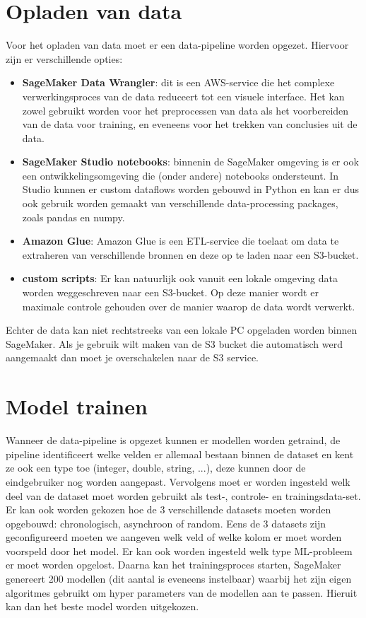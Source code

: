 \section{Opladen van data}
Voor het opladen van data moet er een data-pipeline worden opgezet. Hiervoor zijn er verschillende opties:
\begin{itemize}
    \item \textbf{SageMaker Data Wrangler}: dit is een AWS-service die het complexe verwerkingsproces van de data reduceert tot een visuele interface. Het kan zowel gebruikt worden voor het preprocessen van data als het voorbereiden van de data voor training, en eveneens voor het trekken van conclusies uit de data.
    \item  \textbf{SageMaker Studio notebooks}: binnenin de SageMaker omgeving is er ook een ontwikkelingsomgeving die (onder andere) notebooks ondersteunt. In Studio kunnen er custom dataflows worden gebouwd in Python en kan er dus ook gebruik worden gemaakt van verschillende data-processing packages, zoals pandas en numpy.
    \item \textbf{Amazon Glue}:  Amazon Glue is een ETL-service die toelaat om data te extraheren van verschillende bronnen en deze op te laden naar een S3-bucket.
    \item \textbf{custom scripts}: Er kan natuurlijk ook vanuit een lokale omgeving data worden weggeschreven naar een S3-bucket. Op deze manier wordt er maximale controle gehouden over de manier waarop de data wordt verwerkt. 
\end{itemize}

 Echter de data kan niet rechtstreeks van een lokale PC opgeladen worden binnen SageMaker. Als je gebruik wilt maken van de S3 bucket die automatisch werd aangemaakt dan moet je overschakelen naar de S3 service. 

\section{Model trainen}
Wanneer de data-pipeline is opgezet kunnen er modellen worden getraind, de pipeline identificeert welke velden er allemaal bestaan binnen de dataset en kent ze ook een type toe (integer, double, string, ...), deze kunnen door de eindgebruiker nog worden aangepast. Vervolgens moet er worden ingesteld welk deel van de dataset moet worden gebruikt als test-, controle- en trainingsdata-set. Er kan ook worden gekozen hoe de 3 verschillende datasets moeten worden opgebouwd: chronologisch, asynchroon of random. Eens de 3 datasets zijn geconfigureerd moeten we aangeven welk veld of welke kolom er moet worden voorspeld door het model. Er kan ook worden ingesteld welk type ML-probleem er moet worden opgelost. Daarna kan het trainingsproces starten, SageMaker genereert 200 modellen (dit aantal is eveneens instelbaar) waarbij het zijn eigen algoritmes gebruikt om hyper parameters van de modellen aan te passen. Hieruit kan dan het beste model worden uitgekozen. 

